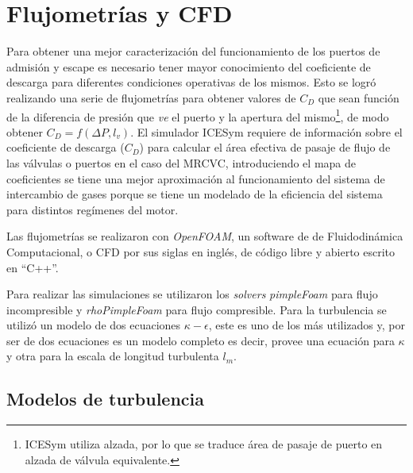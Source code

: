 \section{Flujometrías y CFD}
%
Para obtener una mejor caracterización del funcionamiento de los puertos de
admisión y escape es necesario tener mayor conocimiento del coeficiente de
descarga para diferentes condiciones operativas de los mismos.
%
Esto se logró realizando una serie de flujometrías para obtener valores de
$C_{D}$ que sean función de la diferencia de presión que \emph{ve} el puerto y
la apertura del mismo\footnote{ICESym utiliza alzada, por lo que se traduce
área de pasaje de puerto en alzada de válvula equivalente.}, de modo obtener
$C_{D} = f(\Delta P,l_v)$.
%
El simulador ICESym requiere de información sobre el coeficiente de descarga
($C_{D}$) para calcular el área efectiva de pasaje de flujo de las válvulas o
puertos en el caso del MRCVC, introduciendo el mapa de coeficientes se tiene
una mejor aproximación al funcionamiento del sistema de intercambio de gases
porque se tiene un modelado de la eficiencia del sistema para distintos
regímenes del motor.

Las flujometrías se realizaron con \emph{OpenFOAM}, un software de de
Fluidodinámica Computacional, o CFD por sus siglas en inglés, de código libre y
abierto escrito en ``C++''.
%

Para realizar las simulaciones se utilizaron los \emph{solvers}
\emph{pimpleFoam} para flujo incompresible y \emph{rhoPimpleFoam} para flujo
compresible.
%
Para la turbulencia se utilizó un modelo de dos ecuaciones
\emph{$\kappa-\epsilon$}\parencite{wilcox}, este es uno de los más utilizados
y, por ser de dos ecuaciones es un modelo completo es decir, provee una
ecuación para $\kappa$ y otra para la escala de longitud turbulenta $l_m$.
%

\subsection{Modelos de turbulencia}

